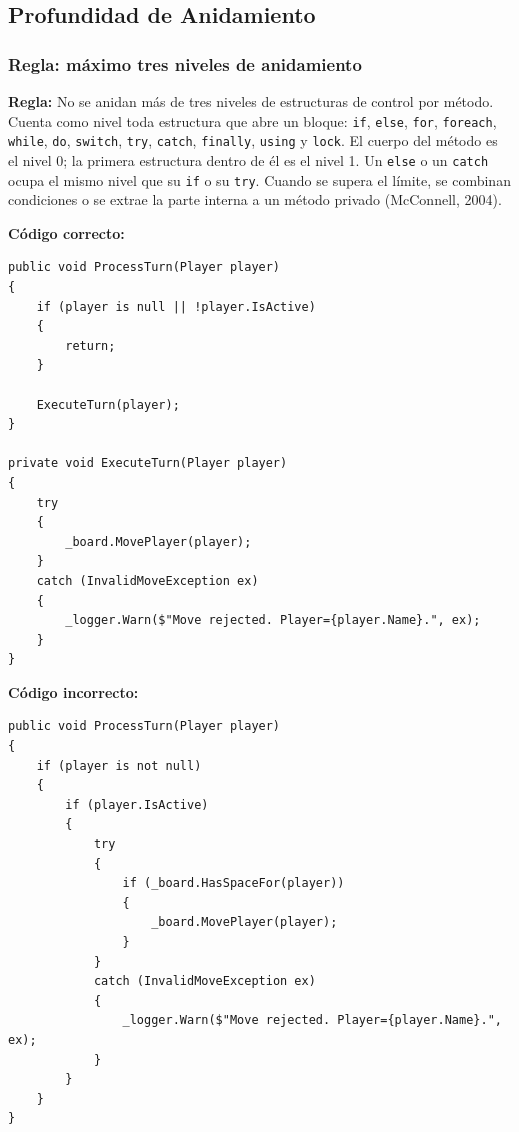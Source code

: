 \subsection{Profundidad de Anidamiento}

\subsubsection{Regla: máximo tres niveles de anidamiento}

\textbf{Regla:} No se anidan más de tres niveles de estructuras de control por método. Cuenta como nivel toda estructura que abre un bloque: \texttt{if}, \texttt{else}, \texttt{for}, \texttt{foreach}, \texttt{while}, \texttt{do}, \texttt{switch}, \texttt{try}, \texttt{catch}, \texttt{finally}, \texttt{using} y \texttt{lock}. El cuerpo del método es el nivel 0; la primera estructura dentro de él es el nivel 1. Un \texttt{else} o un \texttt{catch} ocupa el mismo nivel que su \texttt{if} o su \texttt{try}. Cuando se supera el límite, se combinan condiciones o se extrae la parte interna a un método privado (McConnell, 2004).

\textbf{Código correcto:}
\begin{lstlisting}[style=csharpstyle]
public void ProcessTurn(Player player)
{
    if (player is null || !player.IsActive)
    {
        return;
    }

    ExecuteTurn(player);
}

private void ExecuteTurn(Player player)
{
    try
    {
        _board.MovePlayer(player);
    }
    catch (InvalidMoveException ex)
    {
        _logger.Warn($"Move rejected. Player={player.Name}.", ex);
    }
}
\end{lstlisting}

\textbf{Código incorrecto:}
\begin{lstlisting}[style=csharpstyle]
public void ProcessTurn(Player player)
{
    if (player is not null)
    {
        if (player.IsActive)
        {
            try
            {
                if (_board.HasSpaceFor(player))
                {
                    _board.MovePlayer(player);
                }
            }
            catch (InvalidMoveException ex)
            {
                _logger.Warn($"Move rejected. Player={player.Name}.", ex);
            }
        }
    }
}
\end{lstlisting}

